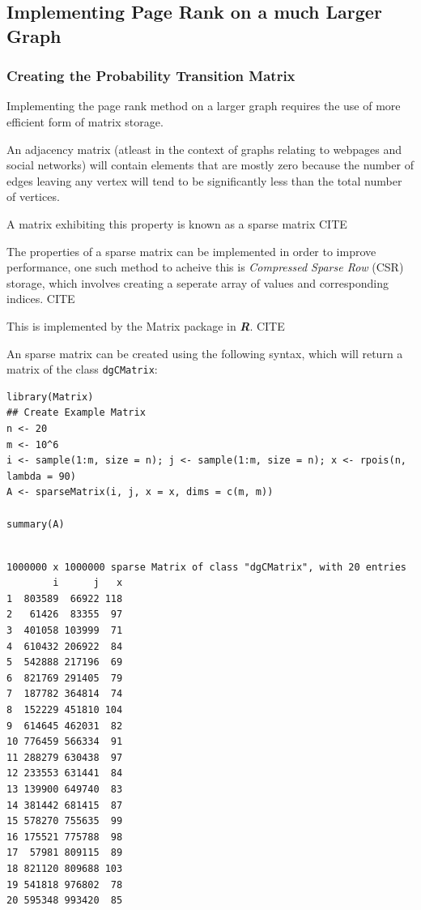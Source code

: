 \documentclass[11pt]{article}
\begin{document}
\subsection{Implementing Page Rank on a much Larger Graph}
\label{sec:orgdfd9fdf}
\subsubsection{Creating the Probability Transition Matrix}
\label{sec:orgc266609}
Implementing the page rank method on a larger graph requires the use of more efficient form of matrix storage.

An adjacency matrix (atleast in the context of graphs relating to webpages and social networks) will contain elements that are mostly zero because the number of edges leaving any vertex will tend to be significantly less than the total number of vertices.

A matrix exhibiting this property is known as a sparse matrix CITE

The properties of a sparse matrix can be implemented in order to improve performance, one such method to acheive this is \emph{Compressed Sparse Row} (CSR) storage, which involves creating a seperate array of values and corresponding indices. CITE

This is implemented by the Matrix package in \textbf{\emph{R}}. CITE

An sparse matrix can be created using the following syntax, which will return a matrix of the class \texttt{dgCMatrix}:

\begin{verbatim}
library(Matrix)
## Create Example Matrix
n <- 20
m <- 10^6
i <- sample(1:m, size = n); j <- sample(1:m, size = n); x <- rpois(n, lambda = 90)
A <- sparseMatrix(i, j, x = x, dims = c(m, m))

summary(A)
\end{verbatim}

\begin{verbatim}

1000000 x 1000000 sparse Matrix of class "dgCMatrix", with 20 entries
        i      j   x
1  803589  66922 118
2   61426  83355  97
3  401058 103999  71
4  610432 206922  84
5  542888 217196  69
6  821769 291405  79
7  187782 364814  74
8  152229 451810 104
9  614645 462031  82
10 776459 566334  91
11 288279 630438  97
12 233553 631441  84
13 139900 649740  83
14 381442 681415  87
15 578270 755635  99
16 175521 775788  98
17  57981 809115  89
18 821120 809688 103
19 541818 976802  78
20 595348 993420  85
\end{verbatim}
\end{document}

